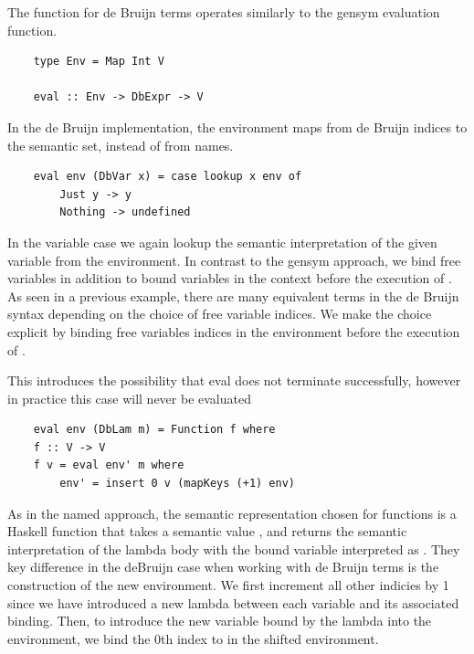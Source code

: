 
The  function for de Bruijn terms operates similarly to the gensym evaluation function. 

\begin{lstlisting}
    type Env = Map Int V

    eval :: Env -> DbExpr -> V
\end{lstlisting}

In the de Bruijn implementation, the environment maps from de Bruijn indices to the semantic set, instead of from names.

\begin{lstlisting}
    eval env (DbVar x) = case lookup x env of
        Just y -> y
        Nothing -> undefined
\end{lstlisting}

In the variable case we again lookup the semantic interpretation of the given variable from the environment. In contrast to the gensym approach, we bind free variables in addition to bound variables in the context before the execution of . As seen in a previous example, there are many equivalent terms in the de Bruijn syntax depending on the choice of free variable indices. We make the choice explicit by binding free variables indices in the environment before the execution of . 


This introduces the possibility that eval does not terminate successfully, however in practice this case will never be evaluated 


\begin{lstlisting}
    eval env (DbLam m) = Function f where
    f :: V -> V
    f v = eval env' m where
        env' = insert 0 v (mapKeys (+1) env)
\end{lstlisting}

As in the named approach, the semantic representation chosen for functions is a Haskell function that takes a semantic value , and returns the semantic interpretation of the lambda body with the bound variable interpreted as . They key difference in the deBruijn case when working with de Bruijn terms is the construction of the new environment. We first increment all other indicies by 1 since we have introduced a new lambda between each variable and its associated binding. Then, to introduce the new variable bound by the lambda into the environment, we bind the 0th index to  in the shifted environment.

